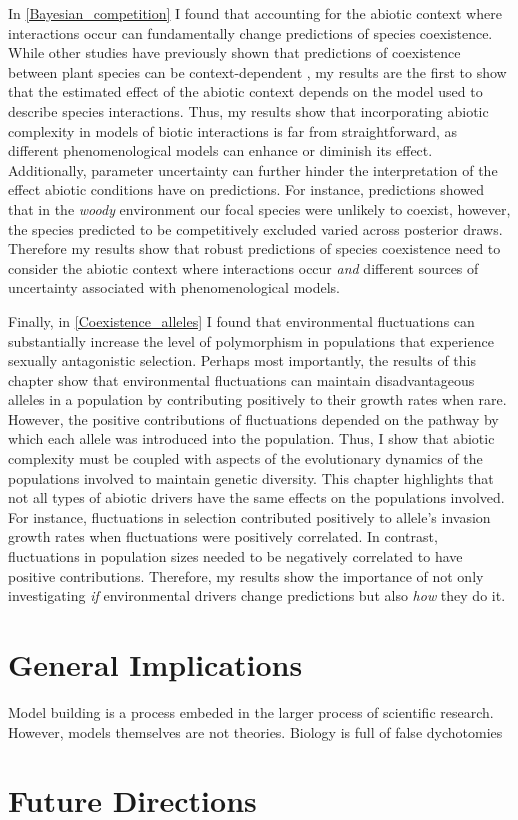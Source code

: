 \begin{refsection}
In \autoref{Bayesian_competition} I found that accounting for the abiotic context where interactions occur can fundamentally change predictions of species coexistence. While other studies have previously shown that predictions of coexistence between plant species can be context-dependent \citep{bimler_accurate_2018,lanuza_opposing_2018}, my results are the first to show that the estimated effect of the abiotic context depends on the model used to describe species interactions. Thus, my results show that incorporating abiotic complexity in models of biotic interactions is far from straightforward, as different phenomenological models can enhance or diminish its effect. Additionally, parameter uncertainty can further hinder the interpretation of the effect abiotic conditions have on predictions. For instance, predictions showed that in the \textit{woody} environment our focal species were unlikely to coexist, however, the species predicted to be competitively excluded varied across posterior draws. Therefore my results show that robust predictions of species coexistence need to consider the abiotic context where interactions occur \textit{and} different sources of uncertainty associated with phenomenological models.

Finally, in \autoref{Coexistence_alleles} I found that environmental fluctuations can substantially increase the level of polymorphism in populations that experience sexually antagonistic selection. Perhaps most importantly, the results of this chapter show that environmental fluctuations can maintain disadvantageous alleles in a population by contributing positively to their growth rates when rare. However, the positive contributions of fluctuations depended on the pathway by which each allele was introduced into the population. Thus, I show that abiotic complexity must be coupled with aspects of the evolutionary dynamics of the populations involved to maintain genetic diversity. This chapter highlights that not all types of abiotic drivers have the same effects on the populations involved. For instance, fluctuations in selection contributed positively to allele's invasion growth rates when fluctuations were positively correlated. In contrast, fluctuations in population sizes needed to be negatively correlated to have positive contributions. Therefore, my results show the importance of not only investigating \textit{if} environmental drivers change predictions but also \textit{how} they do it.


\section*{General Implications}
Model building is a process embeded in the larger process of scientific research. However, models themselves are not theories. Biology is full of false dychotomies 



\section*{Future Directions}



\printbibliography
\end{refsection}
